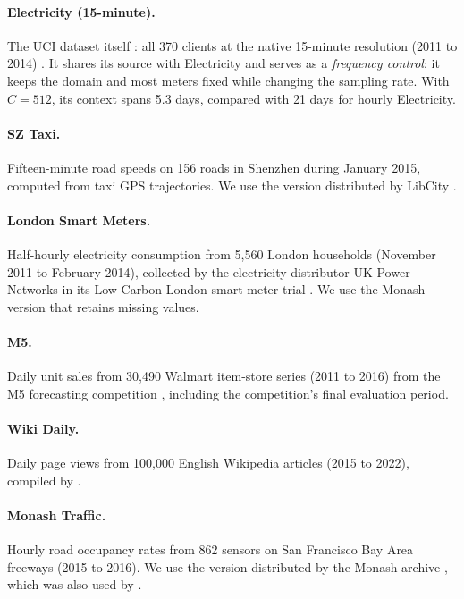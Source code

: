 \documentclass{article} %
\begin{document}
\paragraph{Electricity (15-minute).}
The UCI dataset itself \citep{electricityloaddiagrams20112014_321}: all 370 clients at the native
15-minute resolution (2011 to 2014)
\citep{godahewa2021monashtimeseriesforecasting}. It shares its source with Electricity and serves as a \emph{frequency control}: it keeps the domain and most meters fixed while changing the sampling rate. With $C=512$, its context spans 5.3 days, compared with 21 days for hourly Electricity.

\paragraph{SZ Taxi.}
Fifteen-minute road speeds on 156 roads in Shenzhen during January 2015, computed from taxi GPS trajectories. We use the version distributed by LibCity \citep{jiang2024libcityunifiedlibraryefficient}.

\paragraph{London Smart Meters.}
Half-hourly electricity consumption from 5,560 London households (November 2011 to February
2014), collected by the electricity distributor UK Power Networks in its Low Carbon London
smart-meter trial
\citep{jeanmidev_smartmeters_london,godahewa2021monashtimeseriesforecasting}. We use the Monash
version that retains missing values.

\paragraph{M5.}
Daily unit sales from 30,490 Walmart item-store series (2011 to 2016) from the M5 forecasting
competition \citep{m5-forecasting-accuracy}, including the competition's final evaluation
period.

\paragraph{Wiki Daily.}
Daily page views from 100,000 English Wikipedia articles (2015 to 2022), compiled by
\citet{ansari2024chronoslearninglanguagetime}.

\paragraph{Monash Traffic.}
Hourly road occupancy rates from 862 sensors on San Francisco Bay Area freeways (2015 to 2016). We use the version distributed by the Monash archive \citep{godahewa2021monashtimeseriesforecasting}, which was also used by \citet{lai2018modelinglongshorttermtemporal}.
\end{document}
